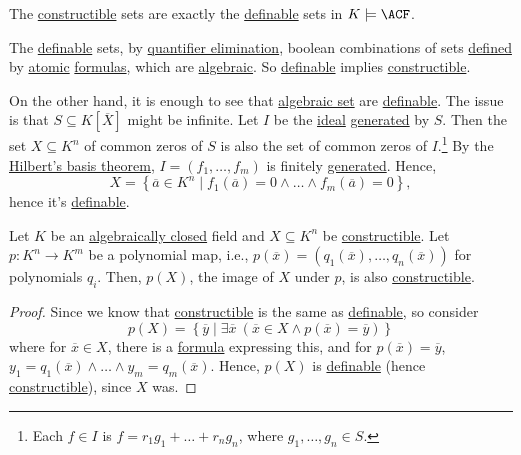 \begin{remark}
	The \hyperref[def:constructible]{constructible} sets are exactly the \hyperref[def:definable]{definable} sets in \(K \models \ACF\).
\end{remark}
\begin{explanation}
	The \hyperref[def:definable]{definable} sets, by \hyperref[def:quantifier-elimination]{quantifier elimination}, boolean combinations of sets \hyperref[def:definable]{defined} by \hyperref[not:atomic]{atomic} \hyperref[def:formula]{formulas}, which are \hyperref[def:algebraic-set]{algebraic}. So \hyperref[def:definable]{definable} implies \hyperref[def:constructible]{constructible}.

	On the other hand, it is enough to see that \hyperref[def:algebraic-set]{algebraic set} are \hyperref[def:definable]{definable}. The issue is that \(S \subseteq K[\overline{X} ]\) might be infinite. Let \(I\) be the \hyperref[def:ideal]{ideal} \hyperref[def:ideal-generation]{generated} by \(S\). Then the set \(X \subseteq K^n\) of common zeros of \(S\) is also the set of common zeros of \(I\).\footnote{Each \(f\in I\) is \(f = r_1 g_1 + \ldots + r_n g_n\), where \(g_1, \ldots , g_n \in S\).} By the \hyperref[thm:Hilbert-basis]{Hilbert's basis theorem}, \(I = (f_1, \ldots , f_m)\) is finitely \hyperref[def:ideal-generation]{generated}. Hence,
	\[
		X = \left\{ \overline{a} \in K^n \mid f_1(\overline{a} ) = 0 \land \ldots \land f_{m}(\overline{a} ) = 0  \right\},
	\]
	hence it's \hyperref[def:definable]{definable}.
\end{explanation}

\begin{theorem}\label{def:Chevalley}
	Let \(K\) be an \hyperref[def:algebraically-closed]{algebraically closed} field and \(X \subseteq K^n\) be \hyperref[def:constructible]{constructible}. Let \(p \colon K^n \to K^m\) be a polynomial map, i.e., \(p(\overline{x} ) = (q_1(\overline{x} ), \ldots , q_n(\overline{x} ))\) for polynomials \(q_i\). Then, \(p(X)\), the image of \(X\) under \(p\), is also \hyperref[def:constructible]{constructible}.
\end{theorem}
\begin{proof}
	Since we know that \hyperref[def:constructible]{constructible} is the same as \hyperref[def:definable]{definable}, so consider
	\[
		p(X) = \left\{ \overline{y} \mid \exists \overline{x} \ (\overline{x} \in X \land p(\overline{x} ) = \overline{y} ) \right\}
	\]
	where for \(\overline{x} \in X\), there is a \hyperref[def:formula]{formula} expressing this, and for \(p(\overline{x} ) = \overline{y} \), \(y_1 = q_1(\overline{x} ) \land \ldots \land y_m=q_m(\overline{x} )\). Hence, \(p(X)\) is \hyperref[def:definable]{definable} (hence \hyperref[def:constructible]{constructible}), since \(X\) was.
\end{proof}

